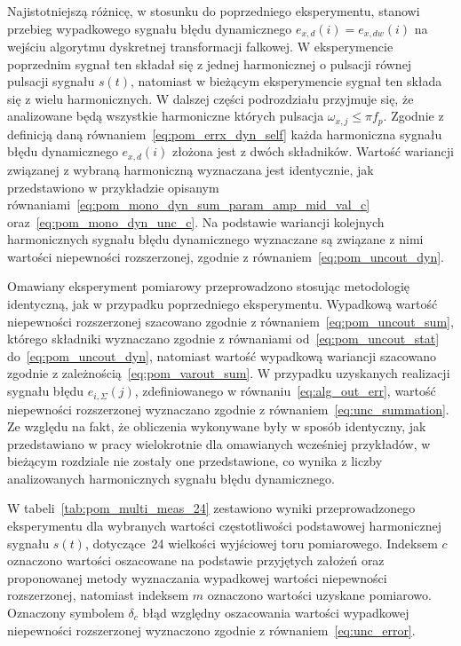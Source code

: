 Najistotniejszą różnicę, w stosunku do poprzedniego eksperymentu, stanowi przebieg wypadkowego sygnału błędu dynamicznego $e_{x,d}(i) = e_{x,dw}(i)$ na wejściu algorytmu dyskretnej transformacji falkowej. W eksperymencie poprzednim sygnał ten składał się z jednej harmonicznej o pulsacji równej pulsacji sygnału $s(t)$, natomiast w bieżącym eksperymencie sygnał ten składa się z wielu harmonicznych. W dalszej części podrozdziału przyjmuje się, że analizowane będą wszystkie harmoniczne których pulsacja $\omega_{x,j} \le \pi f_{p}$. Zgodnie z definicją daną równaniem~\eqref{eq:pom_errx_dyn_self} każda harmoniczna sygnału błędu dynamicznego $e_{x,d}(i)$ złożona jest z dwóch składników. Wartość wariancji związanej z wybraną harmoniczną wyznaczana jest identycznie, jak przedstawiono w przykładzie opisanym równaniami~\eqref{eq:pom_mono_dyn_sum_param_amp_mid_val_c} oraz~\eqref{eq:pom_mono_dyn_unc_c}. Na podstawie wariancji kolejnych harmonicznych sygnału błędu dynamicznego wyznaczane są związane z nimi wartości niepewności rozszerzonej, zgodnie z równaniem~\eqref{eq:pom_uncout_dyn}.

Omawiany eksperyment pomiarowy przeprowadzono stosując metodologię identyczną, jak w przypadku poprzedniego eksperymentu. Wypadkową wartość niepewności rozszerzonej szacowano zgodnie z równaniem~\eqref{eq:pom_uncout_sum}, którego składniki wyznaczano zgodnie z równaniami od~\eqref{eq:pom_uncout_stat} do~\eqref{eq:pom_uncout_dyn}, natomiast wartość wypadkową wariancji szacowano zgodnie z zależnością~\eqref{eq:pom_varout_sum}. W przypadku uzyskanych realizacji sygnału błędu $e_{i,\Sigma}(j)$, zdefiniowanego w równaniu~\eqref{eq:alg_out_err}, wartość niepewności rozszerzonej wyznaczano zgodnie z równaniem~\eqref{eq:unc_summation}. Ze względu na fakt, że obliczenia wykonywane były w sposób identyczny, jak przedstawiano w pracy wielokrotnie dla omawianych wcześniej przykładów, w bieżącym rozdziale nie zostały one przedstawione, co wynika z liczby analizowanych harmonicznych sygnału błędu dynamicznego.

W tabeli~\ref{tab:pom_multi_meas_24} zestawiono wyniki przeprowadzonego eksperymentu dla wybranych wartości częstotliwości podstawowej harmonicznej sygnału $s(t)$, dotyczące~\qty{24}{\numTej} wielkości wyjściowej toru pomiarowego. Indeksem $c$ oznaczono wartości oszacowane na podstawie przyjętych założeń oraz proponowanej metody wyznaczania wypadkowej wartości niepewności rozszerzonej, natomiast indeksem $m$ oznaczono wartości uzyskane pomiarowo. Oznaczony symbolem $\delta_{c}$ błąd względny oszacowania wartości wypadkowej niepewności rozszerzonej wyznaczono zgodnie z równaniem~\eqref{eq:unc_error}.

